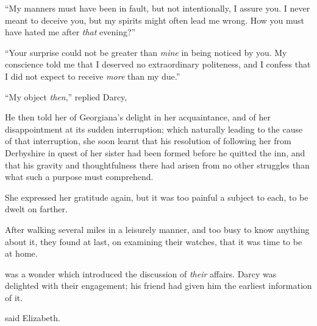 “My manners must have been in fault, but not intentionally, I assure you. I never meant to deceive you, but my spirits might often lead me wrong. How you must have hated me after {\em that} evening?”




“Your surprise could not be greater than {\em mine} in being noticed by you. My conscience told me that I deserved no extraordinary politeness, and I confess that I did not expect to receive {\em more} than my due.”

“My object {\em then},” replied Darcy, 

He then told her of Georgiana's delight in her acquaintance, and of her disappointment at its sudden interruption; which naturally leading to the cause of that interruption, she soon learnt that his resolution of following her from Derbyshire in quest of her sister had been formed before he quitted the inn, and that his gravity and thoughtfulness there had arisen from no other struggles than what such a purpose must comprehend.

She expressed her gratitude again, but it was too painful a subject to each, to be dwelt on farther.

After walking several miles in a leisurely manner, and too busy to know anything about it, they found at last, on examining their watches, that it was time to be at home.

 was a wonder which introduced the discussion of {\em their} affairs. Darcy was delighted with their engagement; his friend had given him the earliest information of it.

 said Elizabeth.


